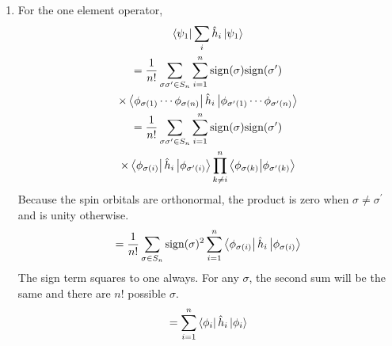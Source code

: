 \documentclass[final,3p,times,twocolumn]{elsarticle}
\begin{document}
\begin{enumerate}
	\item For the one element operator, 
	\begin{gather}
	\bra{\psi_1}\sum_i\hat h_i\ket{\psi_1}\\ 
	\begin{gathered}
	= \frac{1}{n!}\sum_{\sigma\sigma^\prime \in S_n} \sum_{i=1}^n \text{sign}(\sigma)\text{sign}(\sigma^\prime)
	 \\ \times \bra{\phi_{\sigma(1)} \cdots \phi_{\sigma(n)}}\hat h_i \ket{\phi_{\sigma^\prime(1)} \cdots \phi_{\sigma^\prime(n)}} 
	\end{gathered} \\
	 \begin{gathered} = \frac{1}{n!}\sum_{\sigma\sigma^\prime \in S_n} \sum_{i=1}^n \text{sign}(\sigma)\text{sign}(\sigma^\prime) \\
	 \times \bra{\phi_{\sigma(i)}} \hat h_i \ket{\phi_{\sigma^\prime(i)}} \prod_{k\neq i}^n \bra{\phi_{\sigma(k)}}\ket{\phi_{\sigma^\prime(k)}}
	 \end{gathered}
	\end{gather}
	Because the spin orbitals are orthonormal, the product is zero when $\sigma \neq \sigma^\prime$ and is unity otherwise.
	\begin{gather}
	= \frac{1}{n!} \sum_{\sigma \in S_n} \text{sign}(\sigma)^2\sum_{i=1}^n \bra{\phi_{\sigma(i)}} \hat h_i \ket{\phi_{\sigma(i)}}
	\end{gather}
	The sign term squares to one always. For any $\sigma$, the second sum will be the same and there are $n!$ possible $\sigma$.
	\begin{gather}
	= \sum_{i=1}^n \bra{\phi_i}\hat h_i \ket{\phi_i}
	\end{gather}
	

\end{enumerate}
\end{document}
